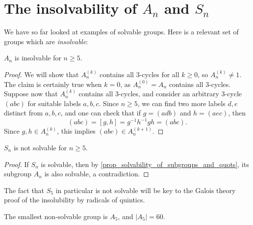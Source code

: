 \section{The insolvability of $A_n$ and $S_n$} 

We have so far looked at examples of solvable groups. Here is a relevant set of groups which are \emph{insolvable}:

\begin{proposition}
    $A_n$ is insolvable for $n \geq 5$.
\end{proposition}

\begin{proof}
    We will show that $A_n^{(k)}$ contains all 3-cycles for all $k \geq 0$, so $A_n^{(k)} \neq 1$. The claim is certainly true when $k = 0$, as $A_n^{(0)} = A_n$ contains all 3-cycles. Suppose now that $A_n^{(k)}$ contains all 3-cycles, and consider an arbitrary 3-cycle $(abc)$ for suitable labels $a, b, c$. Since $n \geq 5$, we can find two more labels $d, e$ distinct from $a, b, c$, and one can check that if $g = (adb)$ and $h = (aec)$, then
    \[
        (abc) = [g, h] = g^{-1}h^{-1}gh = (abc).
    \]
    Since $g, h \in A_n^{(k)}$, this implies $(abc) \in A_n^{(k + 1)}$.
\end{proof}

\begin{corollary}
    $S_n$ is not solvable for $n \geq 5$.
\end{corollary}

\begin{proof}
    If $S_n$ is solvable, then by \cref{prop_solvability_of_subgroups_and_quots}, its subgroup $A_n$ is also solvable, a contradiction.
\end{proof}

The fact that $S_5$ in particular is not solvable will be key to the Galois theory proof of the insolubility by radicals of quintics.

\begin{remark}
    The smallest non-solvable group is $A_5$, and $|A_5| = 60$.
\end{remark}
